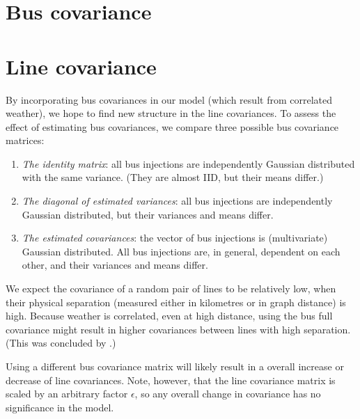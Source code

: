 \documentclass[main.tex]{subfiles}
\begin{document}
\section{Bus covariance}

\section{Line covariance}

By incorporating bus covariances in our model (which result from correlated weather), we hope to find new structure in the line covariances. 
To assess the effect of estimating bus covariances, we compare three possible bus covariance matrices:
\begin{enumerate}
	\item \emph{The identity matrix}: all bus injections are independently Gaussian distributed with the same variance. (They are almost IID, but their means differ.)
	\item \emph{The diagonal of estimated variances}: all bus injections are independently Gaussian distributed, but their variances and means differ.
	\item \emph{The estimated covariances}: the vector of bus injections is (multivariate) Gaussian distributed. All bus injections are, in general, dependent on each other, and their variances and means differ.
\end{enumerate}

We expect the covariance of a random pair of lines to be relatively low, when their physical separation (measured either in kilometres or in graph distance) is high. 
Because weather is correlated, even at high distance, using the bus full covariance might result in higher covariances between lines with high separation. (This was concluded by \cite{Nesti2018emergentfailures}.) 

Using a different bus covariance matrix will likely result in a overall increase or decrease of line covariances. Note, however, that the line covariance matrix is scaled by an arbitrary factor $\epsilon$, so any overall change in covariance has no significance in the model. 

\end{document}
